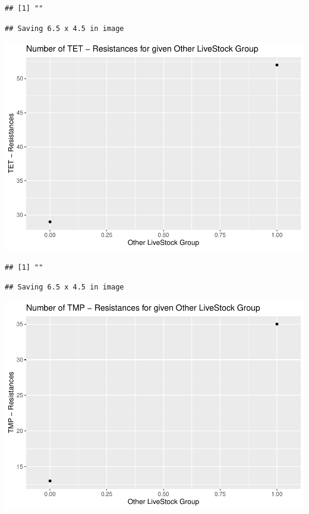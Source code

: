 \documentclass[
]{article}
\begin{document}
\begin{verbatim}
## [1] ""
\end{verbatim}

\begin{verbatim}
## Saving 6.5 x 4.5 in image
\end{verbatim}

\includegraphics{NResistenzen_files/figure-latex/binary_or_nominal_variables-18.pdf}

\begin{verbatim}
## [1] ""
\end{verbatim}

\begin{verbatim}
## Saving 6.5 x 4.5 in image
\end{verbatim}

\includegraphics{NResistenzen_files/figure-latex/binary_or_nominal_variables-19.pdf}
\end{document}
